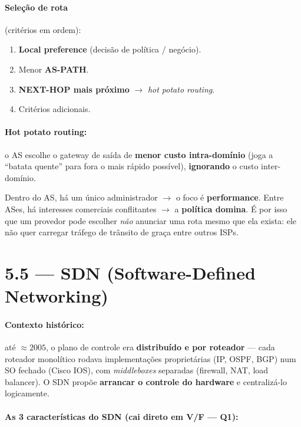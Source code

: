 \documentclass[11pt,a4paper]{article}
\begin{document}
\paragraph{Seleção de rota} (critérios em ordem):
\begin{enumerate}
    \item \textbf{Local preference} (decisão de política / negócio).
    \item Menor \textbf{AS-PATH}.
    \item \textbf{NEXT-HOP mais próximo} $\to$ \textit{hot potato routing}.
    \item Critérios adicionais.
\end{enumerate}

\paragraph{Hot potato routing:} o AS escolhe o gateway de saída de \textbf{menor custo intra-domínio} (joga a ``batata quente'' para fora o mais rápido possível), \textbf{ignorando} o custo inter-domínio.

\begin{reflexao}
Dentro do AS, há um único administrador $\to$ o foco é \textbf{performance}. Entre ASes, há interesses comerciais conflitantes $\to$ a \textbf{política domina}. É por isso que um provedor pode escolher \textit{não} anunciar uma rota mesmo que ela exista: ele não quer carregar tráfego de trânsito de graça entre outros ISPs.
\end{reflexao}

\hrulefill

\section{5.5 --- SDN (Software-Defined Networking)}

\paragraph{Contexto histórico:} até $\approx 2005$, o plano de controle era \textbf{distribuído e por roteador} --- cada roteador monolítico rodava implementações proprietárias (IP, OSPF, BGP) num SO fechado (Cisco IOS), com \textit{middleboxes} separadas (firewall, NAT, load balancer). O SDN propõe \textbf{arrancar o controle do hardware} e centralizá-lo logicamente.

\paragraph{As 3 características do SDN (cai direto em V/F --- Q1):}
\end{document}
